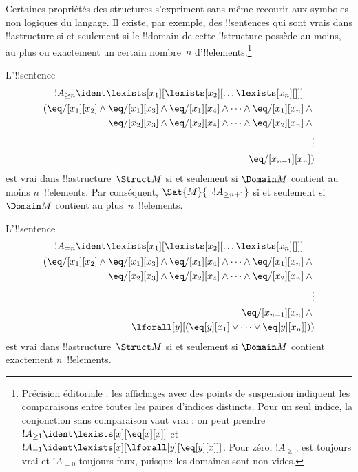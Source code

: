 \documentclass[../../../include/open-logic-section]{subfiles}
\begin{document}


\begin{explain}
Certaines propriétés des structures s'expriment sans même recourir
aux symboles non logiques du langage. Il existe, par exemple, des
!!{sentence}s qui sont vrais dans !!a{structure} si et seulement si
le !!{domain} de cette !!{structure} possède au moins, au plus ou
exactement un certain nombre~$n$ d'!!{element}s.\footnote{Précision éditoriale : les affichages avec des points de suspension indiquent les comparaisons entre toutes les paires d'indices distincts. Pour un seul indice, la conjonction sans comparaison vaut vrai : on peut prendre $!A_{\ge 1}\ident\lexists[x][\eq[x][x]]$ et $!A_{=1}\ident\lexists[x][\lforall[y][\eq[y][x]]]$. Pour zéro, $!A_{\ge0}$ est toujours vrai et $!A_{=0}$ toujours faux, puisque les domaines sont non vides.}
\end{explain}

\begin{prop}
L'!!{sentence}
\begin{multline*}
  !A_{\ge n} \ident \lexists[x_1][\lexists[x_2][\dots\lexists[x_n][{}]]]\\
  \begin{aligned}
  (\eq/[x_1][x_2] \land {}
  \eq/[x_1][x_3] \land \eq/[x_1][x_4] \land \dots \land \eq/[x_1][x_n] \land {}\\
\eq/[x_2][x_3] \land \eq/[x_2][x_4] \land \dots \land {} \eq/[x_2][x_n] \land {} \\
\vdots\\
\eq/[x_{n-1}][x_n])
\end{aligned}
\end{multline*}
est vrai dans !!a{structure}~$\Struct M$ si et seulement si
$\Domain M$ contient au moins $n$~!!{element}s. Par conséquent,
$\Sat{M}{\lnot !A_{\ge n+1}}$ si et seulement si $\Domain M$
contient au plus~$n$~!!{element}s.

\end{prop}

\begin{prop}
L'!!{sentence}
\begin{multline*}
!A_{= n} \ident \lexists[x_1][\lexists[x_2][\dots\lexists[x_n][{}]]] \\
\begin{aligned}
  (\eq/[x_1][x_2] \land {}
  \eq/[x_1][x_3] \land \eq/[x_1][x_4] \land \dots \land \eq/[x_1][x_n] \land {}\\
\eq/[x_2][x_3] \land \eq/[x_2][x_4] \land \dots \land {} \eq/[x_2][x_n] \land {} \\
\vdots\\
\eq/[x_{n-1}][x_n] \land {} \\
\lforall[y][(\eq[y][x_1] \lor \dots \lor \eq[y][x_n]]))
\end{aligned}
\end{multline*}
est vrai dans !!a{structure}~$\Struct M$ si et seulement si
$\Domain M$ contient exactement $n$~!!{element}s.
\end{prop}
\end{document}
